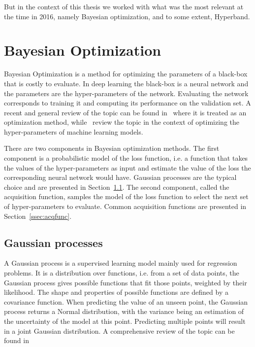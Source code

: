 But in the context of this thesis we worked with what was the most relevant at the time in 2016, namely Bayesian optimization, and to some extent, Hyperband.

\section{Bayesian Optimization}
\label{sec:bo}

Bayesian Optimization is a method for optimizing the parameters of a black-box that is costly to evaluate. In deep learning the black-box is a neural network and the parameters are the hyper-parameters of the network. Evaluating the network corresponds to training it and computing its performance on the validation set. A recent and general review of the topic can be found in~\textcite{shahriari2016IEEE} where it is treated as an optimization method, while~\textcite{snoek2012NIPS} review the topic in the context of optimizing the hyper-parameters of machine learning models.

There are two components in Bayesian optimization methods. The first component is a probabilistic model of the loss function, i.e. a function that takes the values of the hyper-parameters as input and estimate the value of the loss the corresponding neural network would have. Gaussian processes are the typical choice and are presented in Section~\ref{ssec:gp}. 
The second component, called the acquisition function, samples the model of the loss function to select the next set of hyper-parameters to evaluate. Common acquisition functions are presented in Section~\ref{ssec:acqfunc}.

\subsection{Gaussian processes}
\label{ssec:gp}

A Gaussian process is a supervised learning model mainly used for regression problems. It is a distribution over functions, i.e. from a set of data points, the Gaussian process gives possible functions that fit those points, weighted by their likelihood. The shape and properties of possible functions are defined by a covariance function. When predicting the value of an unseen point, the Gaussian process returns a Normal distribution, with the variance being an estimation of the uncertainty of the model at this point. Predicting multiple points will result in a joint Gaussian distribution. A comprehensive review of the topic can be found in~\textcite{rasmussen2005}

